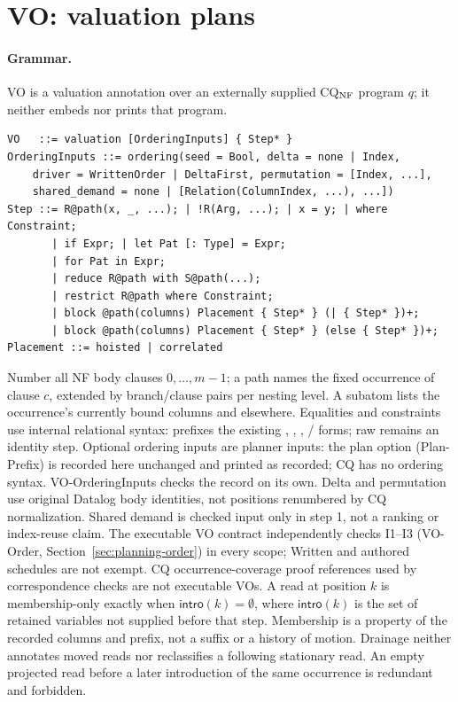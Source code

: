 \section{VO: valuation plans}
\label{sec:vo}\label{sec:nf-vo}

\paragraph{Grammar.} VO is a valuation annotation over an externally supplied
CQ$_{\rm NF}$ program $q$; it neither embeds nor prints that program.
\begin{lstlisting}
VO   ::= valuation [OrderingInputs] { Step* }
OrderingInputs ::= ordering(seed = Bool, delta = none | Index,
    driver = WrittenOrder | DeltaFirst, permutation = [Index, ...],
    shared_demand = none | [Relation(ColumnIndex, ...), ...])
Step ::= R@path(x, _, ...); | !R(Arg, ...); | x = y; | where Constraint;
       | if Expr; | let Pat [: Type] = Expr;
       | for Pat in Expr;
       | reduce R@path with S@path(...);
       | restrict R@path where Constraint;
       | block @path(columns) Placement { Step* } (| { Step* })+;
       | block @path(columns) Placement { Step* } (else { Step* })+;
Placement ::= hoisted | correlated
\end{lstlisting}
Number all NF body clauses $0,\ldots,m-1$; a path  names the fixed
occurrence of clause $c$, extended by branch/clause pairs per nesting level.
A subatom lists the occurrence's currently bound columns and \code{_} elsewhere.
Equalities and constraints use internal relational syntax:  prefixes the existing \code{=}, , , / forms; raw  remains an identity step.
Optional ordering inputs are planner inputs: the  plan
option (Plan-Prefix) is recorded here unchanged and printed as recorded; CQ has
no ordering syntax. VO-OrderingInputs checks the record on its own.
Delta and permutation use original Datalog body identities, not positions
renumbered by CQ normalization. Shared demand is checked input only in step 1,
not a ranking or index-reuse claim. The executable VO contract independently
checks I1--I3 (VO-Order, Section~\ref{sec:planning-order}) in every scope;
Written and authored schedules are not exempt. CQ occurrence-coverage proof
references used by correspondence checks are not executable VOs.
A read at position $k$ is membership-only exactly when
$\mathsf{intro}(k)=\emptyset$, where $\mathsf{intro}(k)$ is the set of
retained variables not supplied before that step. Membership is a property of
the recorded columns and prefix, not a suffix or a history of motion.
Drainage neither annotates moved reads nor reclassifies a following stationary
read. An empty projected read before a later introduction of the same
occurrence is redundant and forbidden.


